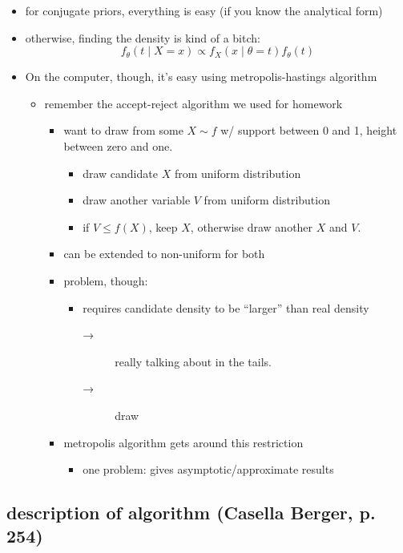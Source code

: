 \begin{itemize}
\item for conjugate priors, everything is easy (if you know the analytical form)
\item otherwise, finding the density is kind of a bitch:
      \[f_\theta(t \mid X = x) \propto f_X(x \mid \theta = t) f_\theta(t)\]
\item On the computer, though, it's easy using metropolis-hastings algorithm
\begin{itemize}
\item remember the accept-reject algorithm we used for homework
\begin{itemize}
\item want to draw from some $X \sim f$ w/ support between 0 and 1,
         height between zero and one.
\begin{itemize}
\item draw candidate $X$ from uniform distribution
\item draw another variable $V$ from uniform distribution
\item if $V \leq f(X)$, keep $X$, otherwise draw another $X$ and $V$.
\end{itemize}
\item can be extended to non-uniform for both
\item problem, though:
\begin{itemize}
\item requires candidate density to be ``larger'' than real density
\begin{description}
\item[→] really talking about in the tails.
\item[→] draw
\end{description}
\end{itemize}
\item metropolis algorithm gets around this restriction
\begin{itemize}
\item one problem: gives asymptotic/approximate results
\end{itemize}
\end{itemize}
\end{itemize}
\end{itemize}
\subsection{description of algorithm (Casella Berger, p. 254)}
\label{sec-3-1}

